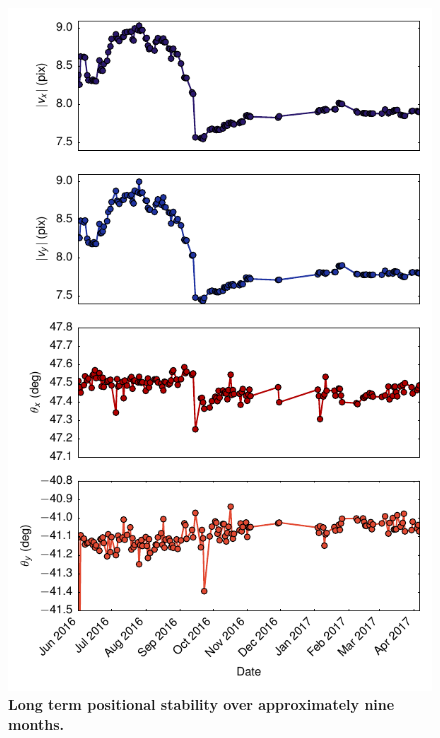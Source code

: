 \documentclass[twocolumn,aps,pra,showpacs,preprintnumbers,bibnotes]{revtex4-1}
\begin{document}
\begin{figure}
  \begin{center}
    \includegraphics{fig/lattice_stability.pdf}
    \caption{\textbf{Long term positional stability over approximately nine months.}}\label{fig:long_term_stability}
  \end{center}
\end{figure}
\end{document}
